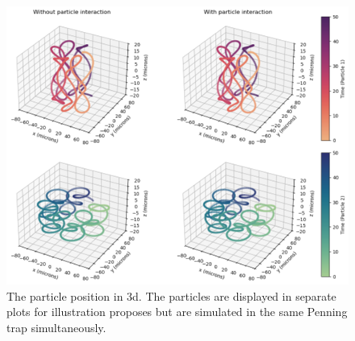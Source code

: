 \documentclass[12pt,a4paper,twocolumn]{article}
\begin{document}
\begin{figure}[h!]
    \centering
    \includegraphics[width=.9\linewidth]{Project 3/figures/two_particles_3d.png}
    \caption{The particle position in 3d. The particles are displayed in separate plots for illustration proposes but are simulated in the same Penning trap simultaneously. }
    \label{fig:two_particles_3d}
\end{figure}
\end{document}
